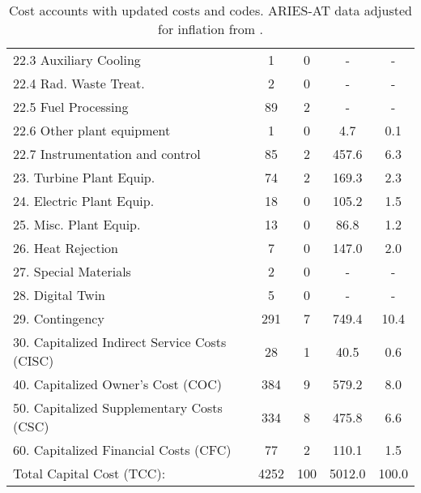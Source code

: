 \begin{table}[h!]
{\begin{tabular}{lcccc}
\hspace{10mm}22.3 Auxiliary Cooling & 1 & 0 & - & - \\
\hspace{10mm}22.4 Rad. Waste Treat. & 2 & 0 & - & - \\
\hspace{10mm}22.5 Fuel Processing & 89 & 2 & - & - \\
\hspace{10mm}22.6 Other plant equipment & 1 & 0 & 4.7 & 0.1 \\
\hspace{10mm}22.7 Instrumentation and control & 85 & 2 & 457.6 & 6.3 \\
\hspace{5mm}23. Turbine Plant Equip. & 74 & 2 & 169.3 & 2.3 \\
\hspace{5mm}24. Electric Plant Equip. & 18 & 0 & 105.2 & 1.5 \\
\hspace{5mm}25. Misc. Plant Equip. & 13 & 0 & 86.8 & 1.2 \\
\hspace{5mm}26. Heat Rejection & 7 & 0 & 147.0 & 2.0 \\
\hspace{5mm}27. Special Materials & 2 & 0 & - & - \\
\hspace{5mm}28. Digital Twin & 5 & 0 & - & - \\
\hspace{5mm}29. Contingency & 291 & 7 & 749.4 & 10.4 \\
30. Capitalized Indirect Service Costs (CISC) & 28 & 1 & 40.5 & 0.6 \\
40. Capitalized Owner’s Cost (COC) & 384 & 9 & 579.2 & 8.0 \\
50. Capitalized Supplementary Costs (CSC) & 334 & 8 & 475.8 & 6.6 \\
60. Capitalized Financial Costs (CFC) & 77 & 2 & 110.1 & 1.5 \\
\hline
Total Capital Cost (TCC): & 4252 & 100 & 5012.0 & 100.0 \\
\hline
\end{tabular}
}
\caption{Cost accounts with updated costs and codes. ARIES-AT data adjusted for inflation from \cite{gordon1986mirror}.}
\label{tab:costs_updated_codes}
\end{table}


